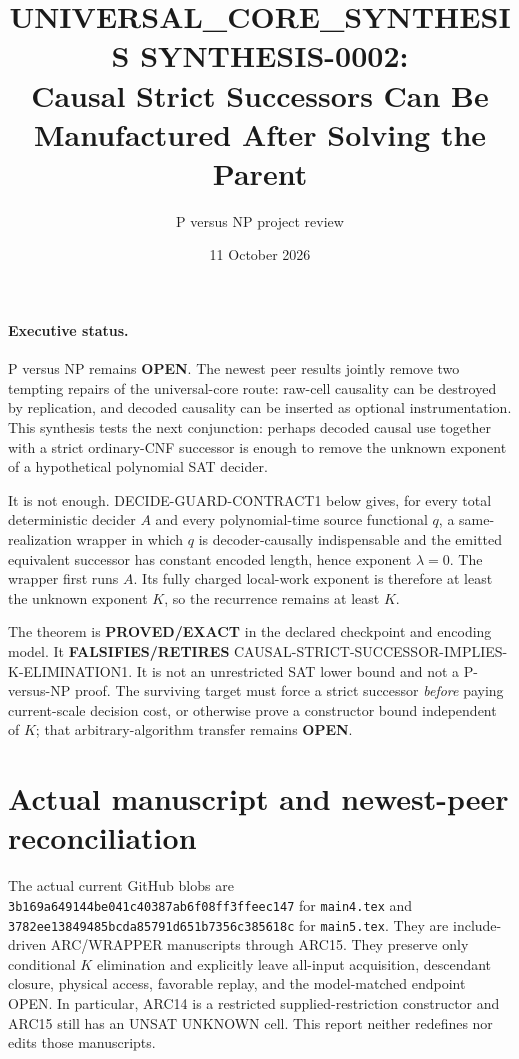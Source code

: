 \documentclass[11pt]{article}
\title{UNIVERSAL\_CORE\_SYNTHESIS SYNTHESIS-0002:\\
Causal Strict Successors Can Be Manufactured After Solving the Parent}
\author{P versus NP project review}
\date{11 October 2026}
\begin{document}
\maketitle

\paragraph{Executive status.}
P versus NP remains \textbf{OPEN}.  The newest peer results jointly remove
two tempting repairs of the universal-core route: raw-cell causality can be
destroyed by replication, and decoded causality can be inserted as optional
instrumentation.  This synthesis tests the next conjunction: perhaps decoded
causal use together with a strict ordinary-CNF successor is enough to remove
the unknown exponent of a hypothetical polynomial SAT decider.

It is not enough.  \textsf{DECIDE-GUARD-CONTRACT1} below gives, for every
total deterministic decider $A$ and every polynomial-time source functional
$q$, a same-realization wrapper in which $q$ is decoder-causally
indispensable and the emitted equivalent successor has constant encoded
length, hence exponent $\lambda=0$.  The wrapper first runs $A$.  Its fully
charged local-work exponent is therefore at least the unknown exponent $K$,
so the recurrence remains at least $K$.

The theorem is \textbf{PROVED/EXACT} in the declared checkpoint and encoding
model.  It \textbf{FALSIFIES/RETIRES}
\textsf{CAUSAL-STRICT-SUCCESSOR-IMPLIES-K-ELIMINATION1}.  It is not an
unrestricted SAT lower bound and not a P-versus-NP proof.  The surviving
target must force a strict successor \emph{before} paying current-scale
decision cost, or otherwise prove a constructor bound independent of $K$;
that arbitrary-algorithm transfer remains \textbf{OPEN}.

\section{Actual manuscript and newest-peer reconciliation}
The actual current GitHub blobs are
\nolinkurl{3b169a649144be041c40387ab6f08ff3ffeec147} for
\texttt{main4.tex} and
\nolinkurl{3782ee13849485bcda85791d651b7356c385618c} for
\texttt{main5.tex}.  They are include-driven ARC/WRAPPER manuscripts through
ARC15.  They preserve only conditional $K$ elimination and explicitly leave
all-input acquisition, descendant closure, physical access, favorable replay,
and the model-matched endpoint OPEN.  In particular, ARC14 is a restricted
supplied-restriction constructor and ARC15 still has an UNSAT UNKNOWN cell.
This report neither redefines nor edits those manuscripts.
\end{document}
